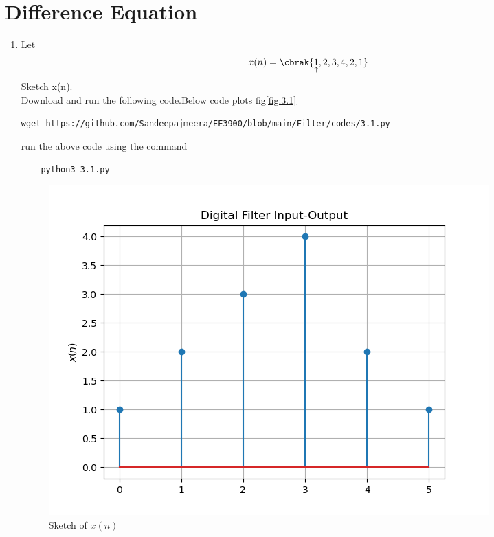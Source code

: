 \documentclass[journal,12pt,twocolumn]{IEEEtran}
\renewcommand\thesection{\arabic{section}}
\begin{document}
\section{Difference Equation}

\begin{enumerate}[label=\thesection.\arabic*
,ref=\thesection.\theenumi]
\item Let 
\begin{align}\label{3.1}
	x(n) = \cbrak{\underset{\uparrow}{1},2,3,4,2,1}
\end{align}
Sketch x(n).\\
\solution Download and run the following code.Below code plots fig\eqref{fig:3.1}
\begin{lstlisting}
wget https://github.com/Sandeepajmeera/EE3900/blob/main/Filter/codes/3.1.py
\end{lstlisting}
run the above code using the command
\begin{lstlisting}
	python3 3.1.py
\end{lstlisting}
\begin{figure}[h]
    \centering
    \includegraphics[width=\columnwidth]{./figs/3.1.png}
    \caption{Sketch of $x(n)$}
    \label{fig:3.1}
\end{figure}


\end{enumerate}
\end{document}
